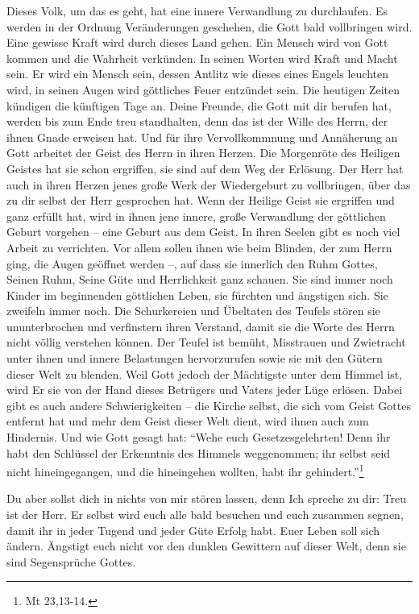 Dieses Volk, um das es geht, hat eine innere Verwandlung zu durchlaufen. Es werden in der Ordnung Veränderungen geschehen, die Gott bald vollbringen wird. Eine gewisse Kraft wird durch dieses Land gehen. Ein Mensch wird von Gott kommen und die Wahrheit verkünden. In seinen Worten wird Kraft und Macht sein. Er wird ein Mensch sein, dessen Antlitz wie dieses eines Engels leuchten wird, in seinen Augen wird göttliches Feuer entzündet sein. Die heutigen Zeiten kündigen die künftigen Tage an. Deine Freunde, die Gott mit dir berufen hat, werden bis zum Ende treu standhalten, denn das ist der Wille des Herrn, der ihnen Gnade erweisen hat. Und für ihre Vervollkommnung und Annäherung an Gott arbeitet der Geist des Herrn in ihren Herzen. Die Morgenröte des Heiligen Geistes hat sie schon ergriffen, sie sind auf dem Weg der Erlösung. Der Herr hat auch in ihren Herzen jenes große Werk der Wiedergeburt zu vollbringen, über das zu dir selbst der Herr gesprochen hat. Wenn der Heilige Geist sie ergriffen und ganz erfüllt hat, wird in ihnen jene innere, große Verwandlung der göttlichen Geburt vorgehen -- eine Geburt aus dem Geist. In ihren Seelen gibt es noch viel Arbeit zu verrichten. Vor allem sollen ihnen wie beim Blinden, der zum Herrn ging, die Augen geöffnet werden --, auf dass sie innerlich den Ruhm Gottes, Seinen Ruhm, Seine Güte und Herrlichkeit ganz schauen. Sie sind immer noch Kinder im beginnenden göttlichen Leben, sie fürchten und ängstigen sich. Sie zweifeln immer noch. Die Schurkereien und Übeltaten des Teufels stören sie ununterbrochen und verfinstern ihren Verstand, damit sie die Worte des Herrn nicht völlig verstehen können. Der Teufel ist bemüht, Misstrauen und Zwietracht unter ihnen und innere Belastungen hervorzurufen sowie sie mit den Gütern dieser Welt zu blenden. Weil Gott jedoch der Mächtigste unter dem Himmel ist, wird Er sie von der Hand dieses Betrügers und Vaters jeder Lüge erlösen. Dabei gibt es auch andere Schwierigkeiten -- die Kirche selbst, die sich vom Geist Gottes entfernt hat und mehr dem Geist dieser Welt dient, wird ihnen auch zum Hindernis. Und wie Gott gesagt hat: "`Wehe euch Gesetzesgelehrten! Denn ihr habt den Schlüssel der Erkenntnis des Himmels weggenommen; ihr selbst seid nicht hineingegangen, und die hineingehen wollten, habt ihr gehindert."'\footnote{Mt 23,13-14.}

Du aber sollst dich in nichts von mir stören lassen, denn Ich spreche zu dir: Treu ist der Herr. Er selbst wird euch alle bald besuchen und euch zusammen segnen, damit ihr in jeder Tugend und jeder Güte Erfolg habt. Euer Leben soll sich ändern. Ängstigt euch nicht vor den dunklen Gewittern auf dieser Welt, denn sie sind Segensprüche Gottes. 

